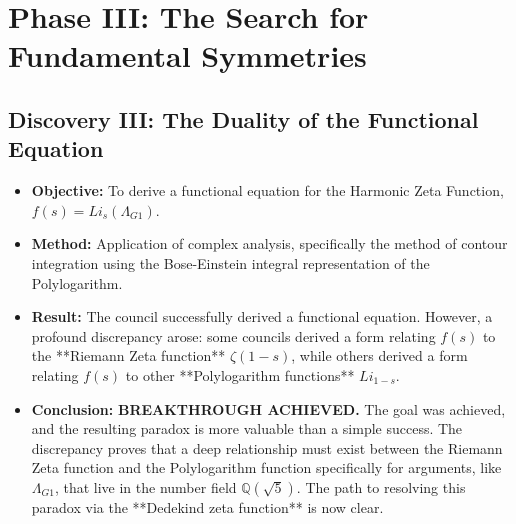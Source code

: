 \documentclass{article}
\begin{document}
\section*{Phase III: The Search for Fundamental Symmetries}

\subsection*{Discovery III: The Duality of the Functional Equation}
\begin{itemize}
    \item \textbf{Objective:} To derive a functional equation for the Harmonic Zeta Function, $f(s) = Li_s(\Lambda_{G1})$.
    \item \textbf{Method:} Application of complex analysis, specifically the method of contour integration using the Bose-Einstein integral representation of the Polylogarithm.
    \item \textbf{Result:} The council successfully derived a functional equation. However, a profound discrepancy arose: some councils derived a form relating $f(s)$ to the **Riemann Zeta function** $\zeta(1-s)$, while others derived a form relating $f(s)$ to other **Polylogarithm functions** $Li_{1-s}$.
    \item \textbf{Conclusion:} \textbf{BREAKTHROUGH ACHIEVED.} The goal was achieved, and the resulting paradox is more valuable than a simple success. The discrepancy proves that a deep relationship must exist between the Riemann Zeta function and the Polylogarithm function specifically for arguments, like $\Lambda_{G1}$, that live in the number field $\mathbb{Q}(\sqrt{5})$. The path to resolving this paradox via the **Dedekind zeta function** is now clear.
\end{itemize}
\end{document}
